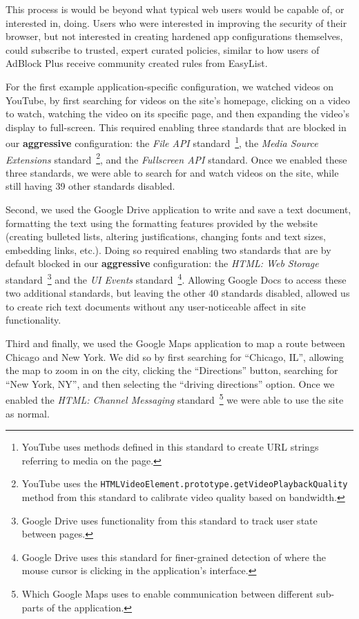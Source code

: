 This process is would be beyond what typical web users would be
capable of, or interested in, doing.  Users who were interested in improving the
security of their browser, but not interested in creating hardened app
configurations themselves, could subscribe to trusted, expert curated policies,
similar to how users of AdBlock Plus receive community created rules from
EasyList.

For the first example application-specific configuration, we watched videos on
YouTube, by first searching for videos on the site's homepage, clicking on a
video to watch, watching the video on its specific page, and then expanding the
video's display to full-screen.  This required enabling three standards
that are blocked in our \textbf{aggressive} configuration: the \textit{File
API} standard~\footnote{YouTube uses methods defined in this standard to create
URL strings referring to media on the page.}, the \textit{Media Source
Extensions} standard~\footnote{YouTube uses the
\texttt{HTMLVideoElement.prototype.getVideoPlaybackQuality} method from this
standard to calibrate video quality based on bandwidth.}, and the
\textit{Fullscreen API} standard. Once we enabled these three standards,
we were able to search for and watch videos on the site, while still
having 39 other standards disabled.

Second, we used the Google Drive application to write and save a text document,
formatting the text using the formatting features provided by the website
(creating bulleted lists, altering justifications, changing fonts and text
sizes, embedding links, etc.).  Doing so required enabling two standards that
are by default blocked in our \textbf{aggressive} configuration: the
\textit{HTML: Web Storage} standard~\footnote{Google Drive uses functionality
from this standard to track user state between pages.} and the \textit{UI
Events} standard~\footnote{Google Drive uses this standard for finer-grained
detection of where the mouse cursor is clicking in the application's
interface.}.  Allowing Google Docs to access these two additional standards,
but leaving the other 40 standards disabled, allowed us to create rich text
documents without any user-noticeable affect in site functionality.

Third and finally, we used the Google Maps application to map a route between
Chicago and New York.  We did so by first searching for ``Chicago, IL'',
allowing the map to zoom in on the city, clicking the ``Directions'' button,
searching for ``New York, NY'', and then selecting the ``driving directions''
option.  Once we enabled the \textit{HTML: Channel Messaging}
standard~\footnote{Which Google Maps uses to enable communication between
different sub-parts of the application.} we were able to use the site as
normal.
